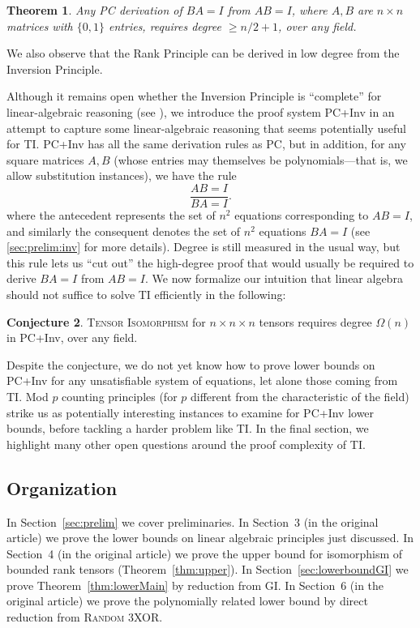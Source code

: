 \documentclass[10pt,a4paper]{article}
\newtheorem{theorem}{Theorem}[section]
\theoremstyle{definition}
\newtheorem{conjecture}[theorem]{Conjecture}
\begin{document}
\begin{theorem}
Any PC derivation of $BA = I$ from $AB=I$, where $A,B$ are $n \times n$ matrices with $\{0,1\}$ entries, requires degree $\geq n/2+1$, over any field.
\end{theorem}

We also observe that the Rank Principle can be derived in low degree from the Inversion Principle. 

Although it remains open whether the Inversion Principle is ``complete'' for linear-algebraic reasoning (see \cite{soltys, SC}), we introduce the proof system PC+Inv in an attempt to capture some linear-algebraic reasoning that seems potentially useful for \textsc{TI}. PC+Inv has all the same derivation rules as PC, but in addition, for any square matrices $A,B$ (whose entries may themselves be polynomials---that is, we allow substitution instances), we have the rule
\[
\frac{AB=I}{BA=I}.
\]
where the antecedent represents the set of $n^2$ equations corresponding to $AB=I$, and similarly the consequent denotes the set of $n^2$ equations $BA=I$ (see \ref{sec:prelim:inv} for more details). Degree is still measured in the usual way, but this rule lets us ``cut out'' the high-degree proof that would usually be required to derive $BA=I$ from $AB=I$. We now formalize our intuition that linear algebra should not suffice to solve \textsc{TI} efficiently in the following:

\begin{conjecture} \label{conj:inv}
\textsc{Tensor Isomorphism} for $n \times n \times n$ tensors requires degree $\Omega(n)$ in PC+Inv, over any field.
\end{conjecture}

Despite the conjecture, we do not yet know how to prove lower bounds on PC+Inv for any unsatisfiable system of equations, let alone those coming from \textsc{TI}. Mod $p$ counting principles (for $p$ different from the characteristic of the field) strike us as potentially interesting instances to examine for PC+Inv lower bounds, before tackling a harder problem like \textsc{TI}. In the final section, we highlight many other open questions around the proof complexity of \textsc{TI}.

\subsection{Organization}
In Section~\ref{sec:prelim} we cover preliminaries. In Section~3 (in the original article) we prove the lower bounds on linear algebraic principles just discussed. In Section~4 (in the original article) we prove the upper bound for isomorphism of bounded rank tensors (Theorem~\ref{thm:upper}). In Section~\ref{sec:lowerboundGI} we prove Theorem~\ref{thm:lowerMain} by reduction from \textsc{GI}. In Section~6 (in the original article) we prove the polynomially related lower bound by direct reduction from \textsc{Random 3XOR}.
\end{document}
